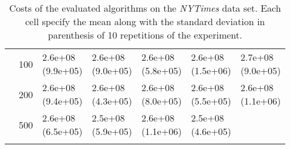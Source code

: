 \begin{longtable}{lllllll}
   & 100 &  \parbox[t]{17mm}{2.6e+08\\\small(9.9e+05)} &  \parbox[t]{17mm}{2.6e+08\\\small(9.0e+05)} &  \parbox[t]{17mm}{2.6e+08\\\small(5.8e+05)} &  \parbox[t]{17mm}{2.6e+08\\\small(1.5e+06)} &  \parbox[t]{17mm}{2.7e+08\\\small(9.0e+05)} \\
   & 200 &  \parbox[t]{17mm}{2.6e+08\\\small(9.4e+05)} &  \parbox[t]{17mm}{2.6e+08\\\small(4.3e+05)} &  \parbox[t]{17mm}{2.6e+08\\\small(8.0e+05)} &  \parbox[t]{17mm}{2.6e+08\\\small(5.5e+05)} &  \parbox[t]{17mm}{2.6e+08\\\small(1.1e+06)} \\
   & 500 &  \parbox[t]{17mm}{2.6e+08\\\small(6.5e+05)} &  \parbox[t]{17mm}{2.5e+08\\\small(5.9e+05)} &  \parbox[t]{17mm}{2.6e+08\\\small(1.1e+06)} &  \parbox[t]{17mm}{2.5e+08\\\small(4.6e+05)} &                 \\
\bottomrule
\caption{Costs of the evaluated algorithms on the \textit{NYTimes} data set. Each cell specify the mean along with the standard deviation in parenthesis of 10 repetitions of the experiment.}
\label{tab:real-cost-mean-std-nytimes}
\end{longtable}

